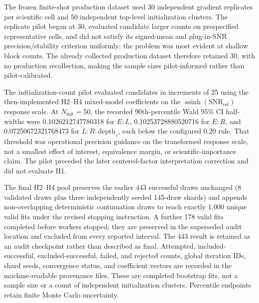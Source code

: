 \documentclass[pdflatex,sn-basic,Numbered]{sn-jnl}
\begin{document}
The frozen finite-shot production dataset used 30 independent gradient replicates per scientific cell and 50 independent top-level initialization clusters. The replicate pilot began at 30, evaluated candidate larger counts on prespecified representative cells, and did not satisfy its signed-mean and plug-in-SNR precision/stability criterion uniformly; the problem was most evident at shallow block counts. The already collected production dataset therefore retained 30, with no production recollection, making the sample sizes pilot-informed rather than pilot-calibrated.

The initialization-count pilot evaluated candidates in increments of 25 using the then-implemented H2--H4 mixed-model coefficients on the $\operatorname{asinh}(\mathrm{SNR}_{\mathrm{est}})$ response scale. At $N_{\mathrm{init}}=50$, the recorded 90th-percentile Wald 95\% CI half-widths were 0.1026212747780318 for $E{:}L$, 0.10253728880520716 for $E{:}R$, and 0.07250672321768473 for $L{:}R{:}\mathrm{depth}_z$, each below the configured 0.20 rule. That threshold was operational precision guidance on the transformed response scale, not a smallest effect of interest, equivalence margin, or scientific-importance claim. The pilot preceded the later centered-factor interpretation correction and did not evaluate H1.

The final H2--H4 pool preserves the earlier 443 successful draws unchanged (8 validated draws plus three independently seeded 145-draw shards) and appends non-overlapping deterministic continuation draws to reach exactly 1,000 unique valid fits under the revised stopping instruction. A further 178 valid fits completed before workers stopped; they are preserved in the superseded audit location and excluded from every reported interval. The 443 result is retained as an audit checkpoint rather than described as final. Attempted, included-successful, excluded-successful, failed, and rejected counts, global iteration IDs, shard seeds, convergence status, and coefficient vectors are recorded in the machine-readable provenance files. These are completed bootstrap fits, not a sample size or a count of independent initialization clusters. Percentile endpoints retain finite Monte Carlo uncertainty.
\end{document}
